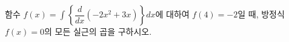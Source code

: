 함수 $f(x)=\displaystyle\int\left\{\dfrac{d}{dx}(-2x^2+3x)\right\}dx$에 대하여 $f(4)=-2$일 때, 방정식 $f(x)=0$의 모든 실근의 곱을 구하시오.

